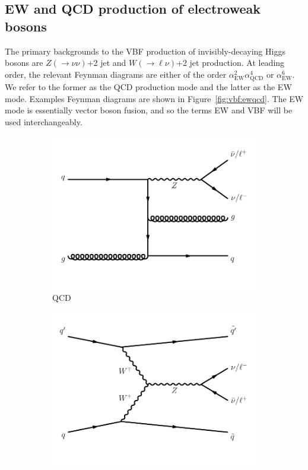 \subsection{EW and QCD production of electroweak bosons}

The primary backgrounds to the VBF production of invisibly-decaying Higgs bosons are $Z(\rightarrow\nu\nu)$+2 jet and $W(\rightarrow\ell\nu)$+2 jet production.
At leading order, the relevant Feynman diagrams are either of the order $\alpha_\mathrm{EW}^2 \alpha_\mathrm{QCD}^4$ or $\alpha_\mathrm{EW}^6$. 
We refer to the former as the QCD production mode and the latter as the EW mode. 
Examples Feynman diagrams are shown in Figure~\ref{fig:vbf:ewqcd}.
The EW mode is essentially vector boson fusion, and so the terms EW and VBF will be used interchangeably. 


\begin{figure}[]
    \begin{center}
        \begin{subfigure}[t]{0.49\textwidth}
            \includegraphics[width=\textwidth]{figures/vbf/diagrams/qcd_z.pdf}
            \caption{QCD}
        \end{subfigure}
        \begin{subfigure}[t]{0.49\textwidth}
            \includegraphics[width=\textwidth]{figures/vbf/diagrams/vbf_z.pdf}

\end{subfigure}
\end{center}
\end{figure}
